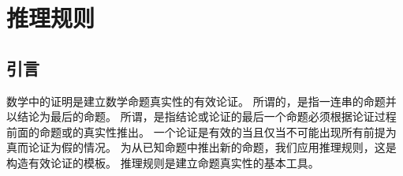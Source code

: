 
\section{推理规则}
{
    \subsection{引言}
    {
        数学中的证明是建立数学命题真实性的有效论证。
        所谓的，是指一连串的命题并以结论为最后的命题。
        所谓，是指结论或论证的最后一个命题必须根据论证过程前面的命题或的真实性推出。
        一个论证是有效的当且仅当不可能出现所有前提为真而论证为假的情况。
        为从已知命题中推出新的命题，我们应用推理规则，这是构造有效论证的模板。
        推理规则是建立命题真实性的基本工具。
    }
}
